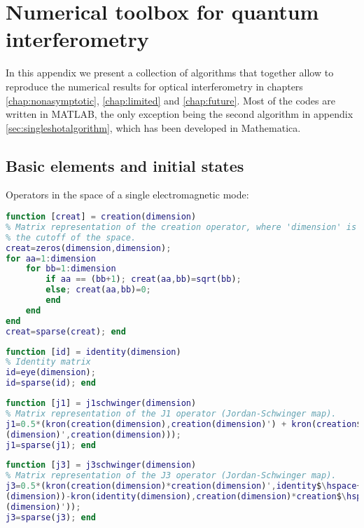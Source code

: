 \chapter{Numerical toolbox for quantum interferometry}
\label{app:numsingle}

In this appendix we present a collection of algorithms that together allow to reproduce the numerical results for optical interferometry in chapters \ref{chap:nonasymptotic}, \ref{chap:limited} and \ref{chap:future}. Most of the codes are written in MATLAB, the only exception being the second algorithm in appendix \ref{sec:singleshotalgorithm}, which has been developed in Mathematica.

\section{Basic elements and initial states}
\label{sec:elementsnum}

Operators in the space of a single electromagnetic mode:
\begin{lstlisting}[language=Matlab]
function [creat] = creation(dimension)
% Matrix representation of the creation operator, where 'dimension' is
% the cutoff of the space.
creat=zeros(dimension,dimension);
for aa=1:dimension
    for bb=1:dimension
        if aa == (bb+1); creat(aa,bb)=sqrt(bb);
        else; creat(aa,bb)=0;
        end
    end
end
creat=sparse(creat); end
\end{lstlisting}

\begin{lstlisting}[language=Matlab]
function [id] = identity(dimension)
% Identity matrix
id=eye(dimension);
id=sparse(id); end
\end{lstlisting}

\begin{lstlisting}[language=Matlab, mathescape=true]
function [j1] = j1schwinger(dimension)
% Matrix representation of the J1 operator (Jordan-Schwinger map).
j1=0.5*(kron(creation(dimension),creation(dimension)') + kron(creation$\hspace{0.15em}\swarrow$
(dimension)',creation(dimension)));
j1=sparse(j1); end
\end{lstlisting}

\begin{lstlisting}[language=Matlab, mathescape=true]
function [j3] = j3schwinger(dimension)
% Matrix representation of the J3 operator (Jordan-Schwinger map).
j3=0.5*(kron(creation(dimension)*creation(dimension)',identity$\hspace{0.15em}\swarrow$
(dimension))-kron(identity(dimension),creation(dimension)*creation$\hspace{0.15em}\swarrow$
(dimension)'));
j3=sparse(j3); end
\end{lstlisting}

